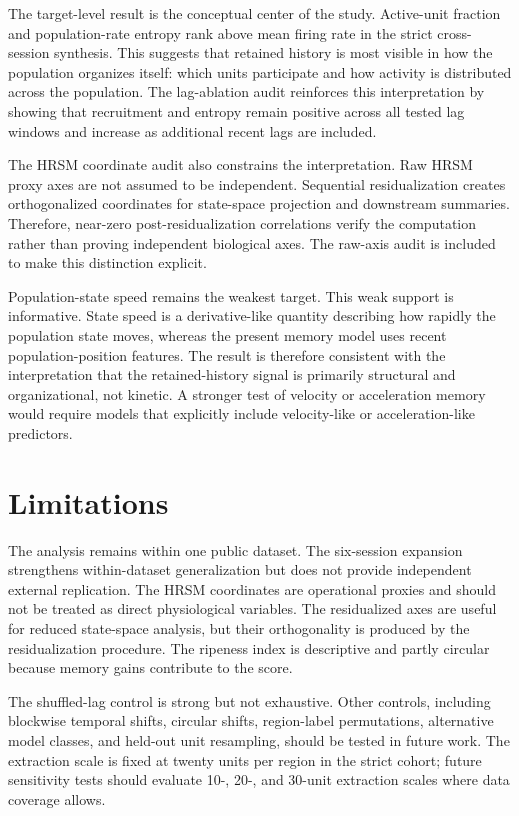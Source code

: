 \documentclass[11pt]{article}
\begin{document}
The target-level result is the conceptual center of the study. Active-unit fraction and population-rate entropy rank above mean firing rate in the strict cross-session synthesis. This suggests that retained history is most visible in how the population organizes itself: which units participate and how activity is distributed across the population. The lag-ablation audit reinforces this interpretation by showing that recruitment and entropy remain positive across all tested lag windows and increase as additional recent lags are included.

The HRSM coordinate audit also constrains the interpretation. Raw HRSM proxy axes are not assumed to be independent. Sequential residualization creates orthogonalized coordinates for state-space projection and downstream summaries. Therefore, near-zero post-residualization correlations verify the computation rather than proving independent biological axes. The raw-axis audit is included to make this distinction explicit.

Population-state speed remains the weakest target. This weak support is informative. State speed is a derivative-like quantity describing how rapidly the population state moves, whereas the present memory model uses recent population-position features. The result is therefore consistent with the interpretation that the retained-history signal is primarily structural and organizational, not kinetic. A stronger test of velocity or acceleration memory would require models that explicitly include velocity-like or acceleration-like predictors.

\section{Limitations}

The analysis remains within one public dataset. The six-session expansion strengthens within-dataset generalization but does not provide independent external replication. The HRSM coordinates are operational proxies and should not be treated as direct physiological variables. The residualized axes are useful for reduced state-space analysis, but their orthogonality is produced by the residualization procedure. The ripeness index is descriptive and partly circular because memory gains contribute to the score.

The shuffled-lag control is strong but not exhaustive. Other controls, including blockwise temporal shifts, circular shifts, region-label permutations, alternative model classes, and held-out unit resampling, should be tested in future work. The extraction scale is fixed at twenty units per region in the strict cohort; future sensitivity tests should evaluate 10-, 20-, and 30-unit extraction scales where data coverage allows.
\end{document}
